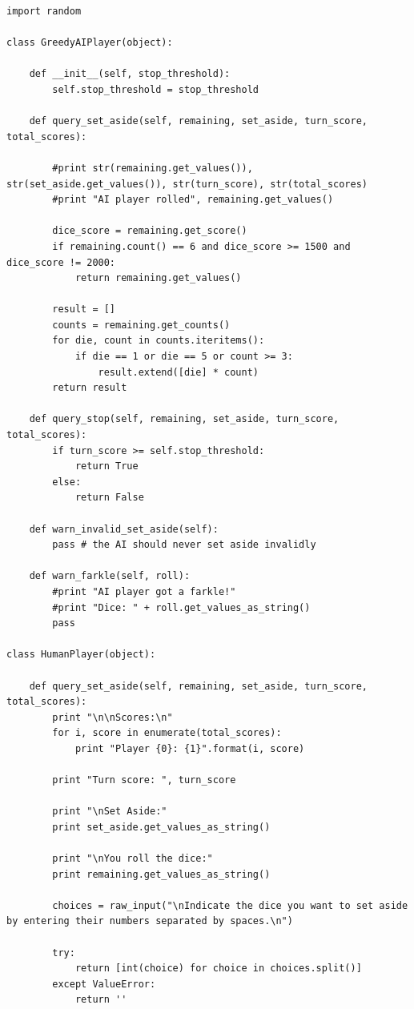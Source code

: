 \documentclass{article}
\begin{document}
\begin{verbatim}
import random

class GreedyAIPlayer(object):

    def __init__(self, stop_threshold):
        self.stop_threshold = stop_threshold

    def query_set_aside(self, remaining, set_aside, turn_score, total_scores):

        #print str(remaining.get_values()), str(set_aside.get_values()), str(turn_score), str(total_scores)
        #print "AI player rolled", remaining.get_values()

        dice_score = remaining.get_score()
        if remaining.count() == 6 and dice_score >= 1500 and dice_score != 2000:
            return remaining.get_values()

        result = []
        counts = remaining.get_counts()
        for die, count in counts.iteritems():
            if die == 1 or die == 5 or count >= 3:
                result.extend([die] * count)
        return result

    def query_stop(self, remaining, set_aside, turn_score, total_scores):
        if turn_score >= self.stop_threshold:
            return True
        else:
            return False

    def warn_invalid_set_aside(self):
        pass # the AI should never set aside invalidly

    def warn_farkle(self, roll):
        #print "AI player got a farkle!"
        #print "Dice: " + roll.get_values_as_string()
        pass

class HumanPlayer(object):

    def query_set_aside(self, remaining, set_aside, turn_score, total_scores):
        print "\n\nScores:\n"
        for i, score in enumerate(total_scores):
            print "Player {0}: {1}".format(i, score)

        print "Turn score: ", turn_score

        print "\nSet Aside:"
        print set_aside.get_values_as_string()

        print "\nYou roll the dice:"
        print remaining.get_values_as_string()

        choices = raw_input("\nIndicate the dice you want to set aside by entering their numbers separated by spaces.\n")

        try:
            return [int(choice) for choice in choices.split()]
        except ValueError:
            return ''


\end{verbatim}
\end{document}
